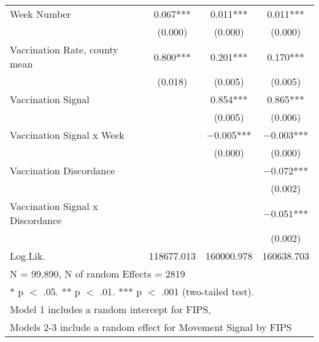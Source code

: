 \begin{table}[!h]
\begin{tabular}[t]{lccc}
Week Number & \num{0.067}*** & \num{0.011}*** & \num{0.011}***\\
 & (\num{0.000}) & (\num{0.000}) & (\num{0.000})\\
Vaccination Rate, county mean & \num{0.800}*** & \num{0.201}*** & \num{0.170}***\\
 & (\num{0.018}) & (\num{0.005}) & (\num{0.005})\\
Vaccination Signal &  & \num{0.854}*** & \num{0.865}***\\
 &  & (\num{0.005}) & (\num{0.006})\\
Vaccination Signal x Week &  & \num{-0.005}*** & \num{-0.003}***\\
 &  & (\num{0.000}) & (\num{0.000})\\
Vaccination Discordance &  &  & \num{-0.072}***\\
 &  &  & \vphantom{1} (\num{0.002})\\
Vaccination Signal x Discordance &  &  & \num{-0.051}***\\
 &  &  & (\num{0.002})\\
\midrule
Log.Lik. & \num{118677.013} & \num{160000.978} & \num{160638.703}\\
\bottomrule
\multicolumn{4}{l}{\rule{0pt}{1em}N = 99,890, N of random Effects = 2819}\\
\multicolumn{4}{l}{\rule{0pt}{1em}* p $<$ .05. ** p $<$ .01. *** p $<$ .001 (two-tailed test).}\\
\multicolumn{4}{l}{\rule{0pt}{1em}Model 1 includes a random intercept for FIPS,}\\
\multicolumn{4}{l}{\rule{0pt}{1em}Models 2-3 include a random effect for Movement Signal by FIPS}\\
\end{tabular}
\end{table}